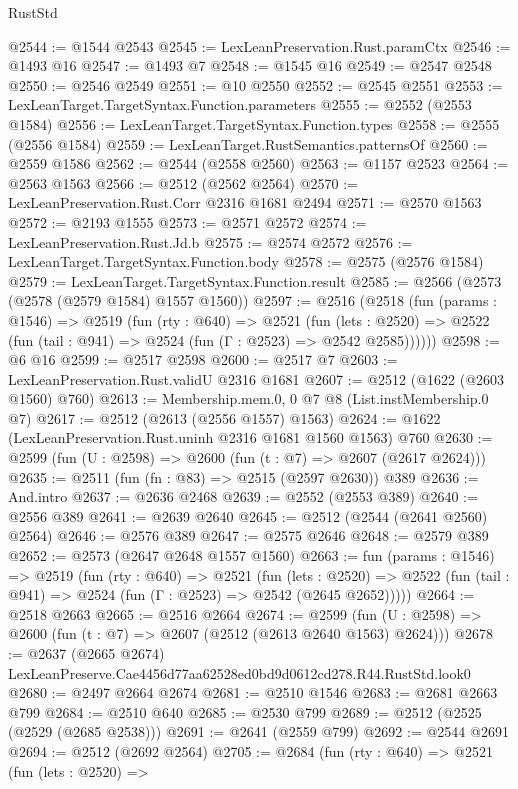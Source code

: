 \begin{lexlean}{RustStd}
\begin{coremodule}
@2544 := @1544 @2543
@2545 := LexLeanPreservation.Rust.paramCtx
@2546 := @1493 @16
@2547 := @1493 @7
@2548 := @1545 @16
@2549 := @2547 @2548
@2550 := @2546 @2549
@2551 := @10 @2550
@2552 := @2545 @2551
@2553 := LexLeanTarget.TargetSyntax.Function.parameters
@2555 := @2552 (@2553 @1584)
@2556 := LexLeanTarget.TargetSyntax.Function.types
@2558 := @2555 (@2556 @1584)
@2559 := LexLeanTarget.RustSemantics.patternsOf
@2560 := @2559 @1586
@2562 := @2544 (@2558 @2560)
@2563 := @1157 @2523
@2564 := @2563 @1563
@2566 := @2512 (@2562 @2564)
@2570 := LexLeanPreservation.Rust.Corr @2316 @1681 @2494
@2571 := @2570 @1563
@2572 := @2193 @1555
@2573 := @2571 @2572
@2574 := LexLeanPreservation.Rust.Jd.b
@2575 := @2574 @2572
@2576 := LexLeanTarget.TargetSyntax.Function.body
@2578 := @2575 (@2576 @1584)
@2579 := LexLeanTarget.TargetSyntax.Function.result
@2585 := @2566 (@2573 (@2578 (@2579 @1584) @1557 @1560))
@2597 := @2516
    (@2518
      (fun (params : @1546) =>
      @2519
        (fun (rty : @640) =>
        @2521
          (fun (lets : @2520) =>
          @2522 (fun (tail : @941) => @2524 (fun (Γ : @2523) => @2542 @2585))))))
@2598 := @6 @16
@2599 := @2517 @2598
@2600 := @2517 @7
@2603 := LexLeanPreservation.Rust.validU @2316 @1681
@2607 := @2512 (@1622 (@2603 @1560) @760)
@2613 := Membership.mem.{0, 0} @7 @8 (List.instMembership.{0} @7)
@2617 := @2512 (@2613 (@2556 @1557) @1563)
@2624 := @1622 (LexLeanPreservation.Rust.uninh @2316 @1681 @1560 @1563) @760
@2630 := @2599 (fun (U : @2598) => @2600 (fun (t : @7) => @2607 (@2617 @2624)))
@2635 := @2511 (fun (fn : @83) => @2515 (@2597 @2630)) @389
@2636 := And.intro
@2637 := @2636 @2468
@2639 := @2552 (@2553 @389)
@2640 := @2556 @389
@2641 := @2639 @2640
@2645 := @2512 (@2544 (@2641 @2560) @2564)
@2646 := @2576 @389
@2647 := @2575 @2646
@2648 := @2579 @389
@2652 := @2573 (@2647 @2648 @1557 @1560)
@2663 := fun (params : @1546) =>
  @2519
    (fun (rty : @640) =>
    @2521
      (fun (lets : @2520) =>
      @2522 (fun (tail : @941) => @2524 (fun (Γ : @2523) => @2542 (@2645 @2652)))))
@2664 := @2518 @2663
@2665 := @2516 @2664
@2674 := @2599 (fun (U : @2598) => @2600 (fun (t : @7) => @2607 (@2512 (@2613 @2640 @1563) @2624)))
@2678 := @2637 (@2665 @2674) LexLeanPreserve.Cae4456d77aa62528ed0bd9d0612cd278.R44.RustStd.look0
@2680 := @2497 @2664 @2674
@2681 := @2510 @1546
@2683 := @2681 @2663 @799
@2684 := @2510 @640
@2685 := @2530 @799
@2689 := @2512 (@2525 (@2529 (@2685 @2538)))
@2691 := @2641 (@2559 @799)
@2692 := @2544 @2691
@2694 := @2512 (@2692 @2564)
@2705 := @2684
    (fun (rty : @640) =>
    @2521
      (fun (lets : @2520) =>

\end{coremodule}
\end{lexlean}
